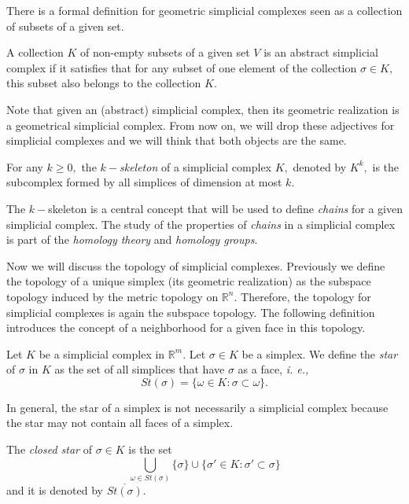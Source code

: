 \documentclass[
	fontsize=10pt, %
	twoside=false, %
	secnumdepth=1, %
]{kaobook}
\begin{document}
There is a formal definition for geometric simplicial complexes seen as a collection of subsets of a given set.

\begin{definition}
A collection $K$ of non-empty subsets of a given set $V$ is an abstract simplicial complex if it satisfies that for any subset of one element of the collection $\sigma\in K,$ this subset also belongs to the collection $K.$
\end{definition}

Note that given an (abstract) simplicial complex, then its geometric realization is a geometrical simplicial complex. From now on, we will drop these adjectives for simplicial complexes and we will think that both objects are the same.

\begin{definition}
For any $k\geq 0,$ the $k-$\emph{skeleton} of a simplicial complex $K,$ denoted by $K^k,$ is the subcomplex formed by all simplices of dimension at most $k.$
\end{definition}

The $k-$skeleton is a central concept that will be used to define \emph{chains} for a given simplicial complex. The study of the properties of \emph{chains} in a simplicial complex is part of the \emph{homology theory} and \emph{homology groups}.

Now we will discuss the topology of simplicial complexes. Previously we define the topology of a unique simplex (its geometric realization) as the subspace topology induced by the metric topology on $\mathbb{R}^n.$ Therefore, the topology for simplicial complexes is again the subspace topology. The following definition introduces the concept of a neighborhood for a given face in this topology.

\begin{definition}
Let $K$ be a simplicial complex in $\mathbb{R}^m.$ Let $\sigma\in K$ be a simplex. We define the \emph{star} of $\sigma$ in $K$ as the set of all simplices that have $\sigma$ as a face, \emph{i. e.,} $$St(\sigma)=\{\omega\in K: \sigma\subset \omega\}.$$
\end{definition}

In general, the star of a simplex is not necessarily a simplicial complex because the star may not contain all faces of a simplex. 

\begin{definition}
The \emph{closed star} of $\sigma\in K$ is the set $$\bigcup_{\omega\in St(\sigma)} \{\sigma\}\cup \{\sigma'\in K: \sigma'\subset \sigma\}$$ and it is denoted by $\overline{St(\sigma)}.$
\end{definition}
\end{document}
